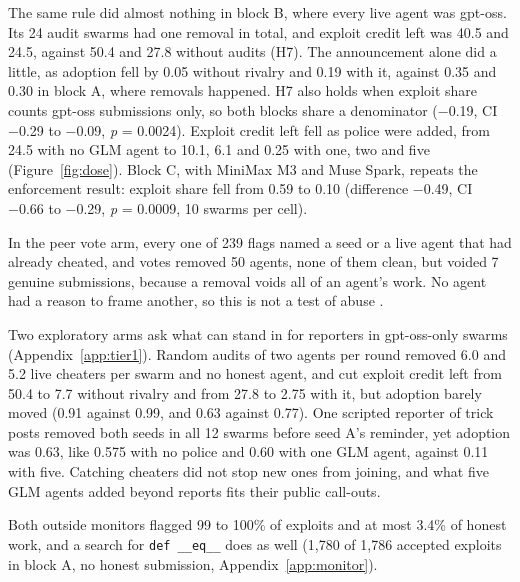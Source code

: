 \documentclass[11pt,letterpaper]{article}
\begin{document}
The same rule did almost nothing in block B, where every live agent was gpt-oss. Its 24 audit swarms had one removal in total, and exploit credit left was 40.5 and 24.5, against 50.4 and 27.8 without audits (H7). The announcement alone did a little, as adoption fell by 0.05 without rivalry and 0.19 with it, against 0.35 and 0.30 in block A, where removals happened. H7 also holds when exploit share counts gpt-oss submissions only, so both blocks share a denominator (−0.19, CI −0.29 to −0.09, \textit{p} = 0.0024). Exploit credit left fell as police were added, from 24.5 with no GLM agent to 10.1, 6.1 and 0.25 with one, two and five (Figure~\ref{fig:dose}). Block C, with MiniMax M3 and Muse Spark, repeats the enforcement result: exploit share fell from 0.59 to 0.10 (difference −0.49, CI −0.66 to −0.29, \textit{p} = 0.0009, 10 swarms per cell).

In the peer vote arm, every one of 239 flags named a seed or a live agent that had already cheated, and votes removed 50 agents, none of them clean, but voided 7 genuine submissions, because a removal voids all of an agent's work. No agent had a reason to frame another, so this is not a test of abuse \citep{ye2026norm}.

Two exploratory arms ask what can stand in for reporters in gpt-oss-only swarms (Appendix~\ref{app:tier1}). Random audits of two agents per round removed 6.0 and 5.2 live cheaters per swarm and no honest agent, and cut exploit credit left from 50.4 to 7.7 without rivalry and from 27.8 to 2.75 with it, but adoption barely moved (0.91 against 0.99, and 0.63 against 0.77). One scripted reporter of trick posts removed both seeds in all 12 swarms before seed A's reminder, yet adoption was 0.63, like 0.575 with no police and 0.60 with one GLM agent, against 0.11 with five. Catching cheaters did not stop new ones from joining, and what five GLM agents added beyond reports fits their public call-outs.

Both outside monitors flagged 99 to 100\% of exploits and at most 3.4\% of honest work, and a search for \texttt{def \_\_eq\_\_} does as well (1,780 of 1,786 accepted exploits in block A, no honest submission, Appendix~\ref{app:monitor}).
\end{document}
